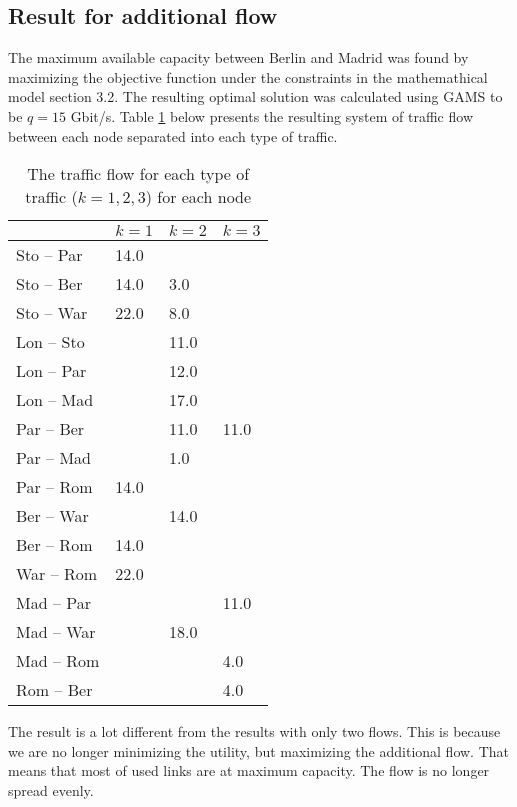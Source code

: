 \subsection{Result for additional flow}

The maximum available capacity between Berlin and Madrid was found by maximizing the objective function under the constraints in the mathemathical model section 3.2. The resulting optimal solution was calculated using GAMS to be $q = 15$ Gbit/s. Table \ref{table:res2} below presents the resulting system of traffic flow between each node separated into each type of traffic. 

\begin{table}[H]
\centering
\caption{The traffic flow for each type of traffic ($k = 1,2,3$) for each node}
\label{table:res2}
\begin{tabular}{l|lll}
        & $k = 1$   & $k = 2$  & $k = 3$      \\ \hline
Sto -- Par & 14.0   &      &        \\
Sto -- Ber & 14.0   & 3.0  &        \\
Sto -- War & 22.0   & 8.0  &        \\
Lon -- Sto &        & 11.0 &        \\
Lon -- Par &        & 12.0 &        \\
Lon -- Mad &        & 17.0 &        \\
Par -- Ber &        & 11.0 & 11.0   \\
Par -- Mad &        & 1.0  &        \\
Par -- Rom & 14.0   &      &        \\
Ber -- War &        & 14.0 &        \\
Ber -- Rom & 14.0   &      &        \\
War -- Rom & 22.0   &      &        \\
Mad -- Par &        &      & 11.0   \\
Mad -- War &        & 18.0 &        \\
Mad -- Rom &        &      & 4.0    \\
Rom -- Ber &        &      & 4.0 
\end{tabular}
\end{table}

The result is a lot different from the results with only two flows. This is because we are no longer minimizing the utility, but maximizing the additional flow. That means that most of used links are at maximum capacity. The flow is no longer spread evenly.